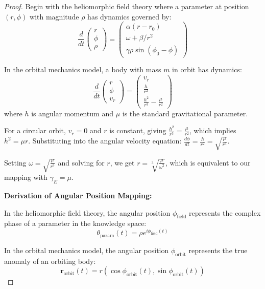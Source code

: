 \begin{proof}
Begin with the heliomorphic field theory where a parameter at position $(r,\phi)$ with magnitude $\rho$ has dynamics governed by:
\begin{equation}
    \frac{d}{dt}\begin{pmatrix} r \\ \phi \\ \rho \end{pmatrix} = \begin{pmatrix} 
    \alpha(r-r_0) \\ 
    \omega + \beta/r^2 \\ 
    \gamma\rho\sin(\phi_0 - \phi) 
    \end{pmatrix}
\end{equation}

In the orbital mechanics model, a body with mass $m$ in orbit has dynamics:
\begin{equation}
    \frac{d}{dt}\begin{pmatrix} r \\ \phi \\ v_r \end{pmatrix} = \begin{pmatrix} 
    v_r \\ 
    \frac{h}{r^2} \\ 
    \frac{h^2}{r^3} - \frac{\mu}{r^2} 
    \end{pmatrix}
\end{equation}
where $h$ is angular momentum and $\mu$ is the standard gravitational parameter.

For a circular orbit, $v_r = 0$ and $r$ is constant, giving $\frac{h^2}{r^3} = \frac{\mu}{r^2}$, which implies $h^2 = \mu r$. Substituting into the angular velocity equation: $\frac{d\phi}{dt} = \frac{h}{r^2} = \sqrt{\frac{\mu}{r^3}}$.

Setting $\omega = \sqrt{\frac{\mu}{r^3}}$ and solving for $r$, we get $r = \sqrt[3]{\frac{\mu}{\omega^2}}$, which is equivalent to our mapping with $\gamma_E = \mu$.

\textbf{Derivation of Angular Position Mapping:}

In the heliomorphic field theory, the angular position $\phi_{\text{field}}$ represents the complex phase of a parameter in the knowledge space:
\begin{equation}
\theta_{\text{param}}(t) = \rho e^{i\phi_{\text{field}}(t)}
\end{equation}

In the orbital mechanics model, the angular position $\phi_{\text{orbit}}$ represents the true anomaly of an orbiting body:
\begin{equation}
\mathbf{r}_{\text{orbit}}(t) = r(\cos\phi_{\text{orbit}}(t), \sin\phi_{\text{orbit}}(t))
\end{equation}


\end{proof}
